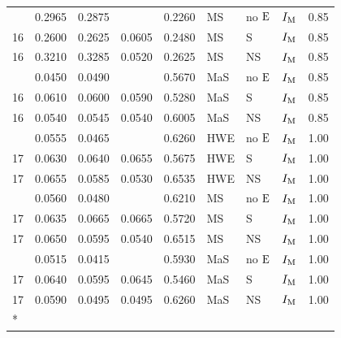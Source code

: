 \begin{longtable}[t]{lllllllll}
\addlinespace
16 & 0.2965 & 0.2875 &  & 0.2260 & MS & no ${\rm E}$ & $I_{{\rm M}}$ & 0.85\\
16 & 0.2600 & 0.2625 & 0.0605 & 0.2480 & MS & S & $I_{{\rm M}}$ & 0.85\\
16 & 0.3210 & 0.3285 & 0.0520 & 0.2625 & MS & NS & $I_{{\rm M}}$ & 0.85\\
\addlinespace
16 & 0.0450 & 0.0490 &  & 0.5670 & MaS & no ${\rm E}$ & $I_{{\rm M}}$ & 0.85\\
16 & 0.0610 & 0.0600 & 0.0590 & 0.5280 & MaS & S & $I_{{\rm M}}$ & 0.85\\
16 & 0.0540 & 0.0545 & 0.0540 & 0.6005 & MaS & NS & $I_{{\rm M}}$ & 0.85\\
\addlinespace
17 & 0.0555 & 0.0465 &  & 0.6260 & HWE & no ${\rm E}$ & $I_{{\rm M}}$ & 1.00\\
17 & 0.0630 & 0.0640 & 0.0655 & 0.5675 & HWE & S & $I_{{\rm M}}$ & 1.00\\
17 & 0.0655 & 0.0585 & 0.0530 & 0.6535 & HWE & NS & $I_{{\rm M}}$ & 1.00\\
\addlinespace
17 & 0.0560 & 0.0480 &  & 0.6210 & MS & no ${\rm E}$ & $I_{{\rm M}}$ & 1.00\\
17 & 0.0635 & 0.0665 & 0.0665 & 0.5720 & MS & S & $I_{{\rm M}}$ & 1.00\\
17 & 0.0650 & 0.0595 & 0.0540 & 0.6515 & MS & NS & $I_{{\rm M}}$ & 1.00\\
\addlinespace
17 & 0.0515 & 0.0415 &  & 0.5930 & MaS & no ${\rm E}$ & $I_{{\rm M}}$ & 1.00\\
17 & 0.0640 & 0.0595 & 0.0645 & 0.5460 & MaS & S & $I_{{\rm M}}$ & 1.00\\
17 & 0.0590 & 0.0495 & 0.0495 & 0.6260 & MaS & NS & $I_{{\rm M}}$ & 1.00\\*
\end{longtable}